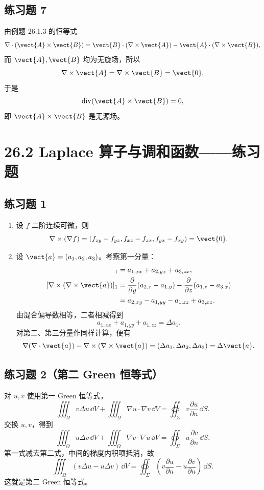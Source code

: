 \subsection*{练习题 7}
\begin{xsolution}
由例题 26.1.3 的恒等式
\[
  \nabla\cdot(\vect{A}\times\vect{B})
  =\vect{B}\cdot(\nabla\times\vect{A})
  -\vect{A}\cdot(\nabla\times\vect{B}),
\]
而 $\vect{A},\vect{B}$ 均为无旋场，所以
\[
  \nabla\times\vect{A}=\nabla\times\vect{B}=\vect{0}.
\]
于是
\[
  \operatorname{div}(\vect{A}\times\vect{B})=0,
\]
即 $\vect{A}\times\vect{B}$ 是无源场。
\end{xsolution}

\section*{26.2 Laplace 算子与调和函数——练习题}

\subsection*{练习题 1}
\begin{xsolution}
\begin{enumerate}[label=(\arabic*)]
  \item 设 $f$ 二阶连续可微，则
  \[
    \nabla\times(\nabla f)
    =\left(
      f_{zy}-f_{yz},
      f_{xz}-f_{zx},
      f_{yx}-f_{xy}
    \right)=\vect{0}.
  \]

  \item 设 $\vect{a}=(a_1,a_2,a_3)$。考察第一分量：
  \begin{align*}
    [\nabla(\nabla\cdot\vect{a})]_1
    &=a_{1,xx}+a_{2,yx}+a_{3,zx},\\
    [\nabla\times(\nabla\times\vect{a})]_1
    &=\frac{\partial}{\partial y}(a_{2,x}-a_{1,y})
      -\frac{\partial}{\partial z}(a_{1,z}-a_{3,x})\\
    &=a_{2,xy}-a_{1,yy}-a_{1,zz}+a_{3,xz}.
  \end{align*}
  由混合偏导数相等，二者相减得到
  \[
    a_{1,xx}+a_{1,yy}+a_{1,zz}=\Delta a_1.
  \]
  对第二、第三分量作同样计算，便有
  \[
    \nabla(\nabla\cdot\vect{a})-\nabla\times(\nabla\times\vect{a})
    =(\Delta a_1,\Delta a_2,\Delta a_3)
    =\Delta\vect{a}.
  \]
\end{enumerate}
\end{xsolution}

\subsection*{练习题 2（第二 Green 恒等式）}
\begin{xsolution}
对 $u,v$ 使用第一 Green 恒等式，
\[
  \iiint_\Omega v\Delta u\,\dd V
  +\iiint_\Omega\nabla u\cdot\nabla v\,\dd V
  =\oiint_\Sigma v\frac{\partial u}{\partial n}\,\dd S.
\]
交换 $u,v$，得到
\[
  \iiint_\Omega u\Delta v\,\dd V
  +\iiint_\Omega\nabla v\cdot\nabla u\,\dd V
  =\oiint_\Sigma u\frac{\partial v}{\partial n}\,\dd S.
\]
第一式减去第二式，中间的梯度内积项抵消，故
\[
  \boxed{
  \iiint_\Omega(v\Delta u-u\Delta v)\,\dd V
  =\oiint_\Sigma\left(
  v\frac{\partial u}{\partial n}
  -u\frac{\partial v}{\partial n}
  \right)\,\dd S
  }.
\]
这就是第二 Green 恒等式。
\end{xsolution}

